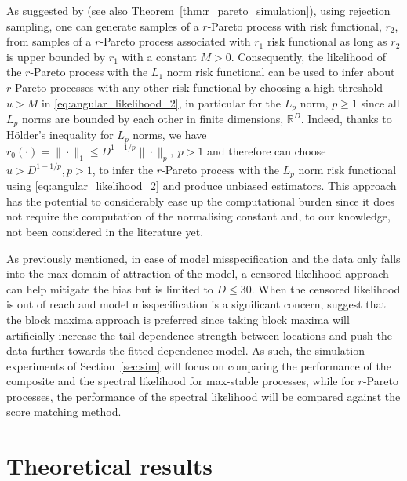 \documentclass[12pt]{article}
\begin{document}
As suggested by \citet[Proposition 2]{Dombry.etal:2024} (see also Theorem~\ref{thm:r_pareto_simulation}), using rejection sampling, one can generate samples of a $r$-Pareto process with risk functional, $r_2$, from samples of a $r$-Pareto process associated with $r_1$ risk functional as long as $r_2$ is upper bounded by $r_1$ with a constant $M>0$. Consequently, the likelihood of the $r$-Pareto process with the $L_1$ norm risk functional can be used to infer about $r$-Pareto processes with any other risk functional by choosing a high threshold $u>M$ in \eqref{eq:angular_likelihood_2}, in particular for the $L_p$ norm, $p\geq 1$ since all $L_p$ norms are bounded by each other in finite dimensions, $\mathbb R^D$. Indeed, thanks to H\"older's inequality for $L_p$ norms, we have $r_0(\cdot)=\|\cdot\|_1 \leq D^{1-1/p}\|\cdot\|_p,\ p>1$ and therefore can choose $u>D^{1-1/p}, p>1$, to infer the $r$-Pareto process with the $L_p$ norm risk functional using \eqref{eq:angular_likelihood_2} and produce unbiased estimators. This approach has the potential to considerably ease up the computational burden since it does not require the computation of the normalising constant and, to our knowledge, not been considered in the literature yet. 

As previously mentioned, in case of model misspecification and the data only falls into the max-domain of attraction of the model, a censored likelihood approach can help mitigate the bias \citep{Wadsworth.Tawn:2014, Huser.etal:2016} but is limited to $D\leq 30$. When the censored likelihood is out of reach and model misspecification is a significant concern, \citet{Huser.etal:2016} suggest that the block maxima approach is preferred since taking block maxima will artificially increase the tail dependence strength between locations and push the data further towards the fitted dependence model. 
% 
As such, the simulation experiments of Section~\ref{sec:sim} will focus on comparing the performance of the composite and the spectral likelihood for max-stable processes, while for $r$-Pareto processes, the performance of the spectral likelihood will be compared against the score matching method.

\section{Theoretical results}
\label{sec:theory}
\end{document}
